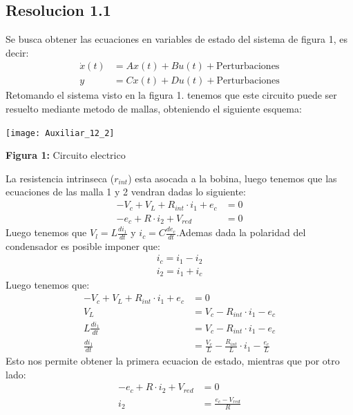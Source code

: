\documentclass[
  11pt,
  letterpaper,
   addpoints,
   answers
  ]{exam}
\begin{document}
\begin{questions}
\begin{solution}
    \subsection*{Resolucion 1.1}
    Se busca obtener las ecuaciones en variables de estado del sistema de figura 1, es decir:
    \begin{align}
        \dot{x}(t) &= Ax(t) + Bu(t) + \text{Perturbaciones} \\
        y &= Cx(t) + Du(t) + \text{Perturbaciones}
    \end{align}
    Retomando el sistema visto en la figura 1. tenemos que este circuito puede ser resuelto mediante metodo de mallas, obteniendo el siguiente esquema:
    \begin{center}
        \texttt{[image: Auxiliar\_12\_2]}
    \end{center}
    \begin{center}
        \textbf{Figura 1:} Circuito electrico
    \end{center}
    La resistencia intrinseca ($r_{int}$) esta asocada a la bobina, luego tenemos que las ecuaciones de las malla 1 y 2 vendran dadas lo siguiente:
    \begin{align}
        -V_{c} + V_{L} + R_{int} \cdot i_{1} + e_{c}&= 0 \\
        -e_{c}  + R\cdot i_{2} + V_{red} &= 0
    \end{align}
    Luego tenemos que $V_{l} = L \frac{di_{1}}{dt}$ y $i_{c}= C\frac{de_{c}}{dt}$.Ademas dada la polaridad del condensador es posible imponer que:
    \begin{align}
        i_{c} = i_{1} - i_{2}\\
        i_{2} = i_{1} + i_{c}
    \end{align}
    Luego tenemos que:
    \begin{align}
        -V_{c} + V_{L} + R_{int} \cdot i_{1} + e_{c}&= 0\\
        V_{L} &= V_{c} - R_{int} \cdot i_{1} - e_{c}\\
        L \frac{di_{1}}{dt} &= V_{c} - R_{int} \cdot i_{1} - e_{c}\\
        \frac{di_{1}}{dt} &= \frac{V_{c}}{L} - \frac{R_{int}}{L} \cdot i_{1} - \frac{e_{c}}{L} 
    \end{align}
    Esto nos permite obtener la primera ecuacion de estado, mientras que por otro lado:
    \begin{align}
        -e_{c} + R\cdot i_{2} + V_{red} &= 0\\
        i_{2} &= \frac{e_{c} - V_{red}}{R}\\ 

\end{align}
\end{solution}
\end{questions}
\end{document}
